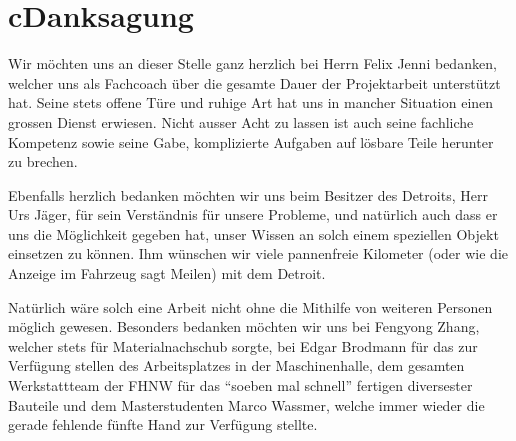 \chapter*{c\quad Danksagung}
Wir möchten uns an dieser Stelle ganz herzlich bei Herrn Felix Jenni bedanken, welcher uns als Fachcoach über die gesamte Dauer der Projektarbeit unterstützt hat. Seine stets offene Türe und ruhige Art hat uns in mancher Situation einen grossen Dienst erwiesen. Nicht ausser Acht zu lassen ist auch seine fachliche Kompetenz sowie seine Gabe, komplizierte Aufgaben auf lösbare Teile herunter zu brechen.

Ebenfalls herzlich bedanken möchten wir uns beim Besitzer des Detroits, Herr Urs Jäger, für sein Verständnis für unsere Probleme, und natürlich auch dass er uns die Möglichkeit gegeben hat, unser Wissen an solch einem speziellen Objekt einsetzen zu können. Ihm wünschen wir viele pannenfreie Kilometer (oder wie die Anzeige im Fahrzeug sagt Meilen) mit dem Detroit.

Natürlich wäre solch eine Arbeit nicht ohne die Mithilfe von weiteren Personen möglich gewesen. Besonders bedanken möchten wir uns bei Fengyong Zhang, welcher stets für Materialnachschub sorgte, bei Edgar Brodmann für das zur Verfügung stellen des Arbeitsplatzes in der Maschinenhalle, dem gesamten Werkstattteam der FHNW für das "`soeben mal schnell"' fertigen diversester Bauteile und dem Masterstudenten Marco Wassmer, welche immer wieder die gerade fehlende fünfte Hand zur Verfügung stellte.

\color{black}